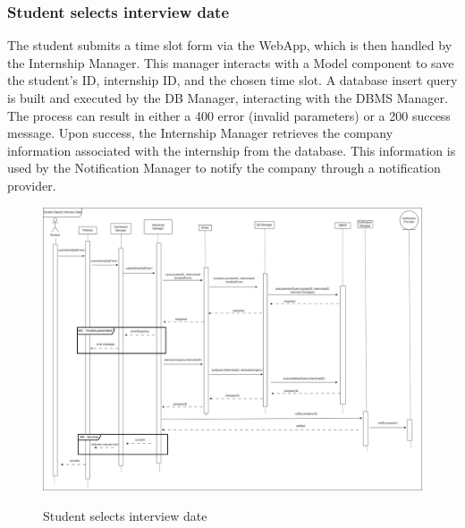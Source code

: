 \documentclass[a4paper,12pt]{article}
\begin{document}
\subsubsection*{Student selects interview date}
The student submits a time slot form via the WebApp, which is then handled by the Internship Manager. This manager interacts with a Model component to save the student's ID, internship ID, and the chosen time slot. A database insert query is built and executed by the DB Manager, interacting with the DBMS Manager. The process can result in either a 400 error (invalid parameters) or a 200 success message. Upon success, the Internship Manager retrieves the company information associated with the internship from the database. This information is used by the Notification Manager to notify the company through a notification provider.
\begin{figure}[H]
\centering
\includegraphics[scale = 0.30]{DD_figures/RuntimeView/StudentSelectsInterviewDateRV.drawio.png}\\
\caption{Student selects interview date}
\end{figure}
\end{document}
